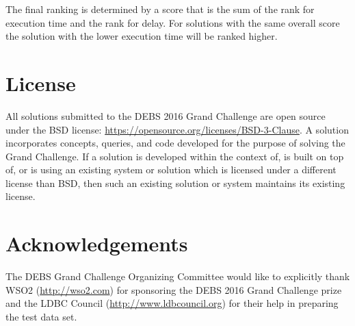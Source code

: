 \documentclass{sig-alternate}
\begin{document}
The final ranking is determined by a score that is the sum of the rank for execution time and the rank for delay. For solutions with the same overall score the solution with the lower execution time will be ranked higher.

\newpage
\section{License}
All solutions submitted to the DEBS 2016 Grand Challenge are open source under the BSD license: \url{https://opensource.org/licenses/BSD-3-Clause}. A solution incorporates concepts, queries, and code developed for the purpose of solving the Grand Challenge. If a solution is developed within the context of, is built on top of, or is using an existing system or solution which is licensed under a different license than BSD, then such an existing solution or system maintains its existing license.

\section{Acknowledgements}
The DEBS Grand Challenge Organizing Committee would like to explicitly thank WSO2 (\url{http://wso2.com}) for sponsoring the DEBS 2016 Grand Challenge prize and the LDBC Council (\url{http://www.ldbcouncil.org}) for their help in preparing the test data set.




\end{document}
